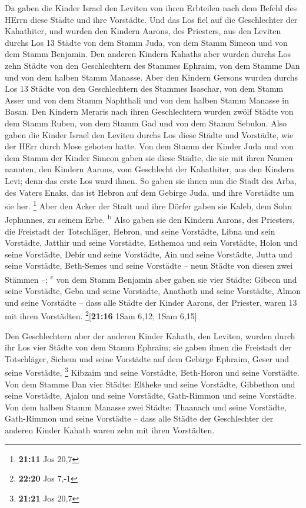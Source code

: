  Da gaben die Kinder Israel den Leviten von ihren
Erbteilen nach dem Befehl des HErrn diese Städte und ihre Vorstädte.
 Und das Los fiel auf die Geschlechter der Kahathiter, und
wurden den Kindern Aarons, des Priesters, aus den Leviten durchs Los 13
Städte von dem Stamm Juda, von dem Stamm Simeon und von dem Stamm
Benjamin.  Den anderen Kindern Kahaths aber wurden durchs
Los zehn Städte von den Geschlechtern des Stammes Ephraim, von dem
Stamme Dan und von dem halben Stamm Manasse.  Aber den
Kindern Gersons wurden durchs Los 13 Städte von den Geschlechtern des
Stammes Isaschar, von dem Stamm Asser und von dem Stamm Naphthali und
von dem halben Stamm Manasse in Basan.  Den Kindern
Meraris nach ihren Geschlechtern wurden zwölf Städte von dem Stamm
Ruben, von dem Stamm Gad und von dem Stamm Sebulon.  Also
gaben die Kinder Israel den Leviten durchs Los diese Städte und
Vorstädte, wie der HErr durch Mose geboten hatte.  Von dem
Stamm der Kinder Juda und von dem Stamm der Kinder Simeon gaben sie
diese Städte, die sie mit ihren Namen nannten,  den
Kindern Aarons, vom Geschlecht der Kahathiter, aus den Kindern Levi;
denn das erste Los ward ihnen.  So gaben sie ihnen nun
die Stadt des Arba, des Vaters Enaks, das ist Hebron auf dem Gebirge
Juda, und ihre Vorstädte um sie her. \footnote{\textbf{21:11} Jos 20,7}
 Aber den Acker der Stadt und ihre Dörfer gaben sie
Kaleb, dem Sohn Jephunnes, zu seinem Erbe. \textsuperscript{b}
 Also gaben sie den Kindern Aarons, des Priesters, die
Freistadt der Totschläger, Hebron, und seine Vorstädte, Libna und sein
Vorstädte,  Jatthir und seine Vorstädte, Esthemoa und
sein Vorstädte,  Holon und seine Vorstädte, Debir und
seine Vorstädte,  Ain und seine Vorstädte, Jutta und
seine Vorstädte, Beth-Semes und seine Vorstädte -- neun Städte von
diesen zwei Stämmen --; \textsuperscript{c}  von dem
Stamm Benjamin aber gaben sie vier Städte: Gibeon und seine Vorstädte,
Geba und seine Vorstädte,  Anathoth und seine Vorstädte,
Almon und seine Vorstädte --  dass alle Städte der Kinder
Aarons, der Priester, waren 13 mit ihren Vorstädten.
\footnote{\textbf{22:20} Jos 7,-1}{[}\textbf{21:16} 1Sam 6,12; 1Sam
6,15{]}

 Den Geschlechtern aber der anderen Kinder Kahath, den
Leviten, wurden durch ihr Los vier Städte von dem Stamm Ephraim;
 sie gaben ihnen die Freistadt der Totschläger, Sichem
und seine Vorstädte auf dem Gebirge Ephraim, Geser und seine Vorstädte,
\footnote{\textbf{21:21} Jos 20,7}  Kibzaim und seine
Vorstädte, Beth-Horon und seine Vorstädte.  Von dem
Stamme Dan vier Städte: Eltheke und seine Vorstädte, Gibbethon und seine
Vorstädte,  Ajalon und seine Vorstädte, Gath-Rimmon und
seine Vorstädte.  Von dem halben Stamm Manasse zwei
Städte: Thaanach und seine Vorstädte, Gath-Rimmon und seine Vorstädte --
 dass alle Städte der Geschlechter der anderen Kinder
Kahath waren zehn mit ihren Vorstädten.

